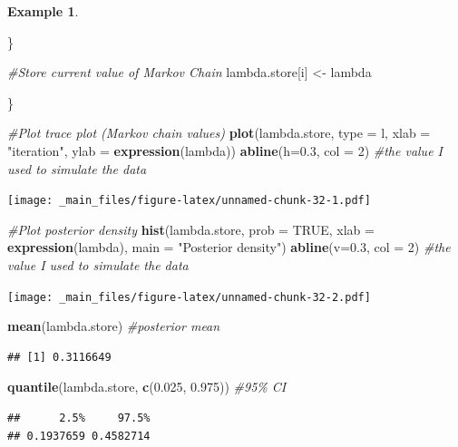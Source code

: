 \documentclass[
]{book}
\newenvironment{Shaded}{\begin{snugshade}}{\end{snugshade}}
\newcommand{\AttributeTok}[1]{\textcolor[rgb]{0.13,0.29,0.53}{#1}}
\newcommand{\CommentTok}[1]{\textcolor[rgb]{0.56,0.35,0.01}{\textit{#1}}}
\newcommand{\ConstantTok}[1]{\textcolor[rgb]{0.56,0.35,0.01}{#1}}
\newcommand{\DecValTok}[1]{\textcolor[rgb]{0.00,0.00,0.81}{#1}}
\newcommand{\FloatTok}[1]{\textcolor[rgb]{0.00,0.00,0.81}{#1}}
\newcommand{\FunctionTok}[1]{\textcolor[rgb]{0.13,0.29,0.53}{\textbf{#1}}}
\newcommand{\NormalTok}[1]{#1}
\newcommand{\OtherTok}[1]{\textcolor[rgb]{0.56,0.35,0.01}{#1}}
\newcommand{\StringTok}[1]{\textcolor[rgb]{0.31,0.60,0.02}{#1}}
\theoremstyle{definition}
\theoremstyle{definition}
\newtheorem{example}{Example}[chapter]
\theoremstyle{definition}
\theoremstyle{definition}
\theoremstyle{remark}
\begin{document}
\begin{example}
\begin{Shaded}
\begin{Highlighting}[]
\NormalTok{  \}}
  
  \CommentTok{\#Store current value of Markov Chain}
\NormalTok{  lambda.store[i] }\OtherTok{\textless{}{-}}\NormalTok{ lambda}
  
\NormalTok{\}}

\CommentTok{\#Plot trace plot (Markov chain values)}
\FunctionTok{plot}\NormalTok{(lambda.store, }\AttributeTok{type =} \StringTok{\textquotesingle{}l\textquotesingle{}}\NormalTok{, }\AttributeTok{xlab =} \StringTok{"iteration"}\NormalTok{, }\AttributeTok{ylab =} \FunctionTok{expression}\NormalTok{(lambda))}
\FunctionTok{abline}\NormalTok{(}\AttributeTok{h=}\FloatTok{0.3}\NormalTok{, }\AttributeTok{col =} \DecValTok{2}\NormalTok{) }\CommentTok{\#the value I used to simulate the data}
\end{Highlighting}
\end{Shaded}

\texttt{[image: \_main\_files/figure-latex/unnamed-chunk-32-1.pdf]}

\begin{Shaded}
\begin{Highlighting}[]
\CommentTok{\#Plot posterior density}
\FunctionTok{hist}\NormalTok{(lambda.store, }\AttributeTok{prob =} \ConstantTok{TRUE}\NormalTok{, }\AttributeTok{xlab =} \FunctionTok{expression}\NormalTok{(lambda), }\AttributeTok{main =} \StringTok{"Posterior density"}\NormalTok{)}
\FunctionTok{abline}\NormalTok{(}\AttributeTok{v=}\FloatTok{0.3}\NormalTok{, }\AttributeTok{col =} \DecValTok{2}\NormalTok{) }\CommentTok{\#the value I used to simulate the data}
\end{Highlighting}
\end{Shaded}

\texttt{[image: \_main\_files/figure-latex/unnamed-chunk-32-2.pdf]}

\begin{Shaded}
\begin{Highlighting}[]
\FunctionTok{mean}\NormalTok{(lambda.store) }\CommentTok{\#posterior mean}
\end{Highlighting}
\end{Shaded}

\begin{verbatim}
## [1] 0.3116649
\end{verbatim}

\begin{Shaded}
\begin{Highlighting}[]
\FunctionTok{quantile}\NormalTok{(lambda.store, }\FunctionTok{c}\NormalTok{(}\FloatTok{0.025}\NormalTok{, }\FloatTok{0.975}\NormalTok{)) }\CommentTok{\#95\% CI}
\end{Highlighting}
\end{Shaded}

\begin{verbatim}
##      2.5%     97.5% 
## 0.1937659 0.4582714
\end{verbatim}

\end{example}
\end{document}

